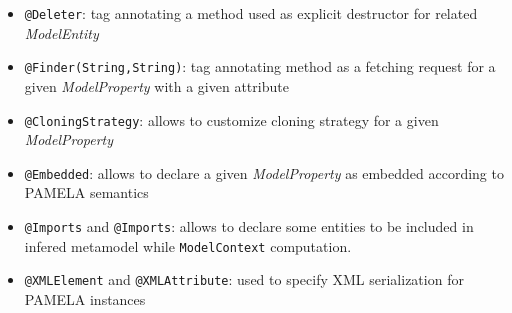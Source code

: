 \begin{itemize}
   \item \texttt{@Deleter}: tag annotating a method used as explicit destructor for related \emph{ModelEntity}
    \item \texttt{@Finder(String,String)}: tag annotating method as a fetching request for a given \emph{ModelProperty} with a given attribute
    \item \texttt{@CloningStrategy}: allows to customize cloning strategy for a given \emph{ModelProperty}
    \item \texttt{@Embedded}: allows to declare a given \emph{ModelProperty} as embedded according to PAMELA semantics
    \item \texttt{@Imports} and \texttt{@Imports}: allows to declare some entities to be included in infered metamodel while \texttt{ModelContext} computation.
    \item \texttt{@XMLElement} and \texttt{@XMLAttribute}: used to specify XML serialization for PAMELA instances
    
\end{itemize}



